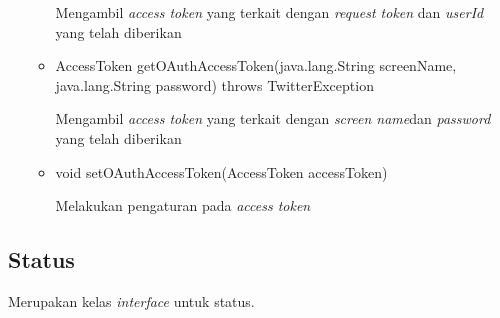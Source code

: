 \begin{itemize}
\begin{itemize}
			Mengambil \textit{access token} yang terkait dengan \textit{request token }dan \textit{userId} yang telah diberikan
			\item AccessToken getOAuthAccessToken(java.lang.String screenName, java.lang.String password) throws TwitterException
			
			Mengambil \textit{access token} yang terkait dengan \textit{screen name}dan \textit{password} yang telah diberikan
			\item void setOAuthAccessToken(AccessToken accessToken)
			
			Melakukan pengaturan pada \textit{access token}
		\end{itemize}
	\end{itemize}
	
	\subsection{Status}
	Merupakan kelas \textit{interface} untuk status.
